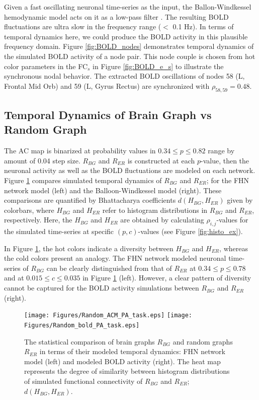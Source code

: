 \documentclass[fleqn,10pt]{wlpeerj}
\begin{document}
Given a fast oscillating neuronal time-series as the input, the Ballon-Windkessel hemodynamic model acts on it as a low-pass filter \citep{FRI00}. The resulting BOLD fluctuations are ultra slow in the frequency range ($<$ 0.1 Hz). In terms of temporal dynamics here, we could produce the BOLD activity in this plausible frequency domain. Figure \ref{fig:BOLD_nodes} demonstrates temporal dynamics of the simulated BOLD activity of a node pair. This node couple is chosen from hot color parameters in the FC$_s$ in Figure \ref{fig:BOLD_e_s} to illustrate the synchronous nodal behavior. The extracted BOLD oscillations of nodes 58 (L, Frontal Mid Orb) and 59 (L, Gyrus Rectus) are synchronized with $\rho_{58,59}=0.48$. 


\subsection*{Temporal Dynamics of Brain Graph vs Random Graph}   

The AC map is binarized at probability values in $0.34 \leq p \leq 0.82$ range by amount of 0.04 step size. $R_{BG}$ and $R_{ER}$ is constructed at each $p$-value, then the neuronal activity as well as the BOLD fluctuations are modeled on each network. Figure \ref{fig:BG_vs_RG} compares simulated temporal dynamics of $R_{BG}$ and $R_{ER}$; for the FHN network model (left) and the Balloon-Windkessel model (right). These comparisons are quantified by Bhattacharya coefficients $d(H_{BG}, H_{ER})$ given by colorbars, where $H_{BG}$ and $H_{ER}$ refer to histogram distributions in $R_{BG}$ and $R_{ER}$, respectively. Here, the $H_{BG}$ and $H_{ER}$ are obtained by calculating $\rho_{i,j}$-values for the simulated time-series at specific $(p,c)$-values (see Figure \ref{fig:histo_ex}). 

In Figure \ref{fig:BG_vs_RG}, the hot colors indicate a diversity between $H_{BG}$ and $H_{ER}$, whereas the cold colors present an analogy. The FHN network modeled neuronal time-series of $R_{BG}$ can be clearly distinguished from that of $R_{ER}$ at $0.34 \leq p \leq 0.78 $ and at $0.015\leq c \leq 0.035$ in Figure \ref{fig:BG_vs_RG} (left). However, a clear pattern of diversity cannot be captured for the BOLD activity simulations between $R_{BG}$ and $R_{ER}$ (right).  

\begin{figure}[htp] \centering
	 \texttt{[image: Figures/Random\_ACM\_PA\_task.eps]} 
	 \texttt{[image: Figures/Random\_bold\_PA\_task.eps]} 
   	 \caption{The statistical comparison of brain graphs $R_{BG}$ and random graphs $R_{ER}$ in terms of their modeled temporal dynamics: FHN network model (left) and modeled BOLD activity (right). The heat map represents the degree of similarity between histogram distributions of simulated functional connectivity of $R_{BG}$ and $R_{ER}$; $d(H_{BG}, H_{ER})$. } 
    \label{fig:BG_vs_RG}
\end{figure} 
\end{document}
